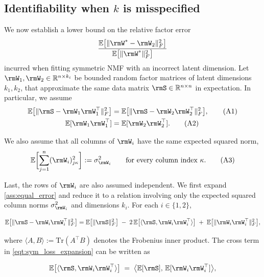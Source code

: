 \documentclass{article}
\begin{document}
\subsection{Identifiability when \texorpdfstring{$k$}{k} is misspecified}
\label{subsec:misspecify_k}
We now establish a lower bound on the relative factor error 
\[
\frac{
\mathbb{E}\bigl[\|\rmW^* - \rmW_2\|_F^2\bigr]
}{
\mathbb{E}\bigl[\|\rmW^*\|_F^2\bigr]
}
\]
incurred when fitting symmetric NMF with an incorrect latent dimension. Let $\rmW_1, \rmW_2 \in \mathbb{R}^{n \times k_i}$ be bounded random factor matrices of latent dimensions $k_1, k_2$, that approximate the same data matrix $\rmS \in \mathbb{R}^{n \times n}$ in expectation. In particular, we assume
\begin{align}
\mathbb{E}\bigl[\|\rmS - \rmW_1\rmW_1^\top\|_F^2\bigr]
&=
\mathbb{E}\bigl[\|\rmS - \rmW_2\rmW_2^\top\|_F^2\bigr],
\tag{A1}
\label{ass:equal_error}
\\
\mathbb{E}[\rmW_1\rmW_1^\top]
&=
\mathbb{E}[\rmW_2\rmW_2^\top].
\tag{A2}
\label{ass:equal_reconstruction}
\end{align}

We also assume that all columns of $\rmW_i$ have the same expected squared norm,
\begin{equation}
\mathbb{E}\biggl[
\sum_{j=1}^n (\rmW_i)_{j\kappa}^2
\biggr]
:= \sigma_{\rmW_i}^2
\qquad
\text{for every column index } \kappa .
\tag{A3}
\label{ass:column_norm}
\end{equation}

Last, the rows of $\rmW_i$ are also assumed independent. We first expand \ref{ass:equal_error} and reduce it to a relation involving only the expected squared column norms $\sigma_{\rmW_i}^2$ and dimensions $k_i$. For each $i \in \{1, 2\}$,

\begin{equation}
\mathbb{E}\bigl[\|\rmS - \rmW_i \rmW_i^\top\|_F^2\bigr]
= \mathbb{E}\bigl[\|\rmS\|_F^2\bigr]
\;-\; 2\,\mathbb{E}\bigl[\langle \rmS, \rmW_i \rmW_i^\top \rangle\bigr]
\;+\; \mathbb{E}\bigl[\|\rmW_i \rmW_i^\top\|_F^2\bigr],
\label{eqt:sym_loss_expansion}
\end{equation}

where $\langle A, B \rangle := \mathrm{Tr}(A^\top B)$ denotes the Frobenius inner product. The cross term in \eqref{eqt:sym_loss_expansion} can be written as

\begin{equation}
\mathbb{E}\bigl[\langle \rmS, \rmW_i \rmW_i^\top \rangle\bigr]
\;=\; \bigl\langle \mathbb{E}[\rmS],\, \mathbb{E}[\rmW_i \rmW_i^\top] \bigr\rangle,
\end{equation}
\end{document}
